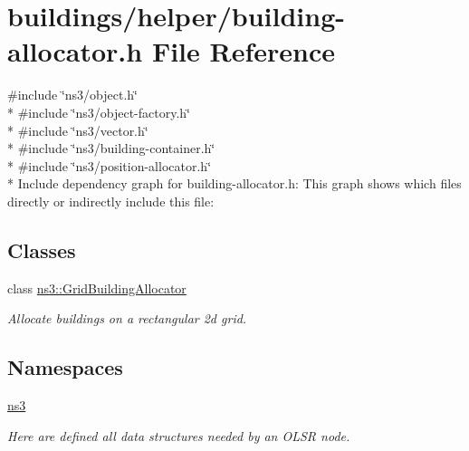 \hypertarget{building-allocator_8h}{}\section{buildings/helper/building-\/allocator.h File Reference}
\label{building-allocator_8h}
{\ttfamily \#include \char`\"{}ns3/object.\+h\char`\"{}}\\*
{\ttfamily \#include \char`\"{}ns3/object-\/factory.\+h\char`\"{}}\\*
{\ttfamily \#include \char`\"{}ns3/vector.\+h\char`\"{}}\\*
{\ttfamily \#include \char`\"{}ns3/building-\/container.\+h\char`\"{}}\\*
{\ttfamily \#include \char`\"{}ns3/position-\/allocator.\+h\char`\"{}}\\*
Include dependency graph for building-\/allocator.h\+:
This graph shows which files directly or indirectly include this file\+:
\subsection*{Classes}
\begin{DoxyCompactItemize}
\item 
class \hyperlink{classns3_1_1GridBuildingAllocator}{ns3\+::\+Grid\+Building\+Allocator}
\begin{DoxyCompactList}\small\item\em Allocate buildings on a rectangular 2d grid. \end{DoxyCompactList}\end{DoxyCompactItemize}
\subsection*{Namespaces}
\begin{DoxyCompactItemize}
\item 
 \hyperlink{namespacens3}{ns3}
\begin{DoxyCompactList}\small\item\em Here are defined all data structures needed by an O\+L\+SR node. \end{DoxyCompactList}\end{DoxyCompactItemize}
